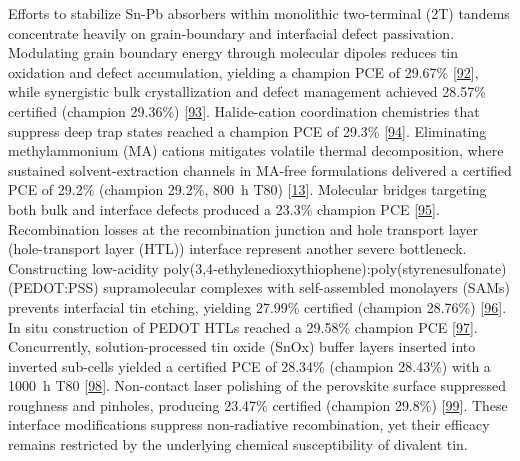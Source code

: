 \documentclass[
  11pt,
]{article}
\begin{document}
Efforts to stabilize Sn-Pb absorbers within monolithic two-terminal (2T)
tandems concentrate heavily on grain-boundary and interfacial defect
passivation. Modulating grain boundary energy through molecular dipoles
reduces tin oxidation and defect accumulation, yielding a champion PCE
of 29.67\% {[}\href{https://doi.org/10.1002/adma.72755}{92}{]}, while
synergistic bulk crystallization and defect management achieved 28.57\%
certified (champion 29.36\%)
{[}\href{https://doi.org/10.1002/adma.73038}{93}{]}. Halide-cation
coordination chemistries that suppress deep trap states reached a
champion PCE of 29.3\%
{[}\href{https://doi.org/10.1002/adma.202522668}{94}{]}. Eliminating
methylammonium (MA) cations mitigates volatile thermal decomposition,
where sustained solvent-extraction channels in MA-free formulations
delivered a certified PCE of 29.2\% (champion 29.2\%, \qty{800}{\hour}
T80) {[}\href{https://doi.org/10.1038/s41467-025-68213-2}{13}{]}.
Molecular bridges targeting both bulk and interface defects produced a
23.3\% champion PCE {[}\href{https://doi.org/10.1002/adfm.74503}{95}{]}.
Recombination losses at the recombination junction and hole transport
layer (hole-transport layer (HTL)) interface represent another severe
bottleneck. Constructing low-acidity
poly(3,4-ethylenedioxythiophene):poly(styrenesulfonate) (PEDOT:PSS)
supramolecular complexes with self-assembled monolayers (SAMs) prevents
interfacial tin etching, yielding 27.99\% certified (champion 28.76\%)
{[}\href{https://doi.org/10.1002/adma.73011}{96}{]}. In situ
construction of PEDOT HTLs reached a 29.58\% champion PCE
{[}\href{https://doi.org/10.1002/adma.202522790}{97}{]}. Concurrently,
solution-processed tin oxide (SnOx) buffer layers inserted into inverted
sub-cells yielded a certified PCE of 28.34\% (champion 28.43\%) with a
\qty{1000}{\hour} T80
{[}\href{https://doi.org/10.1021/acsenergylett.6c00227}{98}{]}.
Non-contact laser polishing of the perovskite surface suppressed
roughness and pinholes, producing 23.47\% certified (champion 29.8\%)
{[}\href{https://doi.org/10.1038/s41467-026-71017-7}{99}{]}. These
interface modifications suppress non-radiative recombination, yet their
efficacy remains restricted by the underlying chemical susceptibility of
divalent tin.
\end{document}
